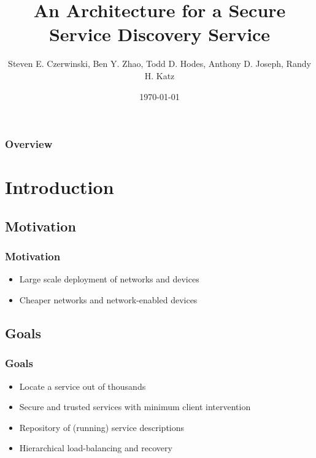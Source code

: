 \documentclass{beamer}
\title[Secure Service Discovery Service]{An Architecture for a Secure Service Discovery Service} %
\author{Steven E. Czerwinski, Ben Y. Zhao, Todd D. Hodes, Anthony D. Joseph, Randy H. Katz} %
\institute[UC Berkeley] %
{
University of California, Berkeley \\ %
\medskip
\textit{\{czerwin, ravenben, hodes, adj, randy\}@cs.berkeley.edu} %
}
\date{\today} %
\begin{document}
\begin{frame}
\titlepage %
\end{frame}

\begin{frame}
\frametitle{Overview} %
\tableofcontents %
\end{frame}


\section{Introduction}
\subsection{Motivation}
\begin{frame}
\frametitle{Motivation}
\begin{itemize}
\item Large scale deployment of networks and devices
\item Cheaper networks and network-enabled devices 
\end{itemize}
\end{frame}
\subsection{Goals} %

\begin{frame}
\frametitle{Goals}
\begin{itemize} 
\item Locate a service out of thousands
\item Secure and trusted services with minimum client intervention
\item Repository of (running) service descriptions
\item Hierarchical load-balancing and recovery
\end{itemize}
\end{frame}
\end{document}
